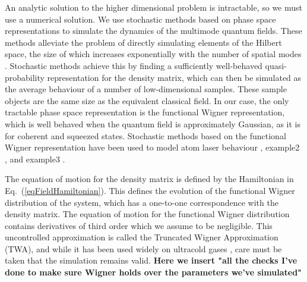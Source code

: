 \documentclass{iopart}
\begin{document}
An analytic solution to the higher dimensional problem is intractable, so we must use a numerical solution.  We use stochastic methods based on phase space representations to simulate the dynamics of the multimode quantum fields.  These methods alleviate the problem of directly simulating elements of the Hilbert space, the size of which increases exponentially with the number of spatial modes \cite{stochasticRefs}.  Stochastic methods achieve this by finding a sufficiently well-behaved quasi-probability representation for the density matrix, which can then be simulated as the average behaviour of a number of low-dimensional samples.  These sample objects are the same size as the equivalent classical field.  In our case, the only tractable phase space representation is the functional Wigner representation, which is well behaved when the quantum field is approximately Gaussian, as it is for coherent and squeezed states.  Stochastic methods based on the functional Wigner representation have been used to model atom laser behaviour \cite{atomLaserWigner}, example2 \cite{example2Wigner}, and example3 \cite{example3Wigner}.

The equation of motion for the density matrix is defined by the Hamiltonian in Eq.~(\ref{eqFieldHamiltonian}).  This defines the evolution of the functional Wigner distribution of the system, which has a one-to-one correspondence with the density matrix.  The equation of motion for the functional Wigner distribution contains derivatives of third order which we assume to be negligible.  This uncontrolled approximation is called the Truncated Wigner Approximation (TWA), and while it has been used widely on ultracold gases \cite{atomlaserWigner,orOtherUCGWigner}, care must be taken that the simulation remains valid.  \textbf{Here we insert "all the checks I've done to make sure Wigner holds over the parameters we've simulated"}
\end{document}
